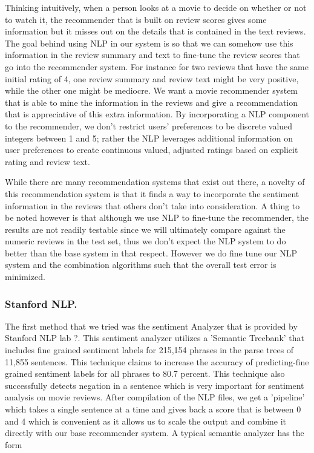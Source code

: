 \documentclass{article} %
\begin{document}
Thinking intuitively, when a person looks at a movie to decide on whether or not to watch it, the recommender that is built on review scores gives some information but it misses out on the details that is contained in the text reviews. The goal behind using NLP in our system is so that we can somehow use this information in the review summary and text to fine-tune the review scores that go into the recommender system. For instance for two reviews that have the same initial rating of 4, one review summary and review text might be very positive, while the other one might be mediocre. We want a movie recommender system that is able to mine the information in the reviews and give a recommendation that is appreciative of this extra information. By incorporating a NLP component to the recommender, we don't restrict users' preferences to be discrete valued integers between 1 and 5; rather the NLP leverages additional information on user preferences to create continuous valued, adjusted ratings based on explicit rating and review text. 

While there are many recommendation systems that exist out there, a novelty of this recommendation system is that it finds a way to incorporate the sentiment information in the reviews that others don't take into consideration. A thing to be noted however is that although we use NLP to fine-tune the recommender, the results are not readily testable since we will ultimately compare against the numeric reviews in the test set, thus we don't expect the NLP system to do better than the base system in that respect. However we do fine tune our NLP system and the combination algorithms such that the overall test error is minimized.  
 
\subsubsection{Stanford NLP.} The first method that we tried was the sentiment Analyzer that is provided by Stanford NLP lab ?. This sentiment analyzer utilizes a 'Semantic Treebank' that includes fine grained sentiment labels for 215,154 phrases in the parse trees of 11,855 sentences. This technique claims to increase the accuracy of predicting-fine grained sentiment labels for all phrases to 80.7 percent. This technique also successfully detects negation in a sentence which is very important for sentiment analysis on movie reviews. After compilation of the NLP files, we get a 'pipeline' which takes a single sentence at a time and gives back a score that is between 0 and 4 which is convenient as it allows us to scale the output and combine it directly with our base recommender system. A typical semantic analyzer has the form
\end{document}
